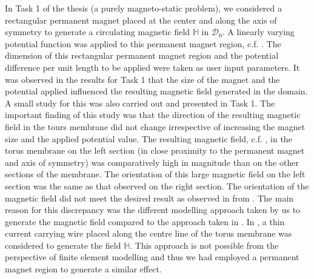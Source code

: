 \documentclass[11pt,a4paper,final]{article}
\begin{document}
In Task 1 of the thesis (a purely magneto-static problem), we considered a rectangular permanent magnet placed at the center and along the axis of symmetry to generate a circulating magnetic field $\mathbb{H}$ in $\mathcal{D}_0$. A linearly varying potential function was applied to this permanent magnet region, c.f. . The dimension of this rectangular permanent magnet region and the potential difference per unit length to be applied were taken as user input parameters. It was observed in the results for Task 1 that the size of the magnet and the potential applied influenced the resulting magnetic field generated in the domain. A small study for this was also carried out and presented in Task 1. The important finding of this study was that the direction of the resulting magnetic field in the tours membrane did not change irrespective of increasing the magnet size and the applied potential value. The resulting magnetic field, c.f. , in the torus membrane on the left section (in close proximity to the permanent magnet and axis of symmetry) was comparatively high in magnitude than on the other sections of the membrane. The orientation of this large magnetic field on the left section was the same as that observed on the right section. The orientation of the magnetic field did not meet the desired result as observed in  from \cite{Reddy2017}. The main reason for this discrepancy was the different modelling approach taken by us to generate the magnetic field compared to the approach taken in \cite{Reddy2017}. In \cite{Reddy2017}, a thin current carrying wire placed along the centre line of the torus membrane was considered to generate the field $\mathbb{H}$. This approach is not possible from the perspective of finite element modelling and thus we had employed a permanent magnet region to generate a similar effect. \par 
\end{document}
